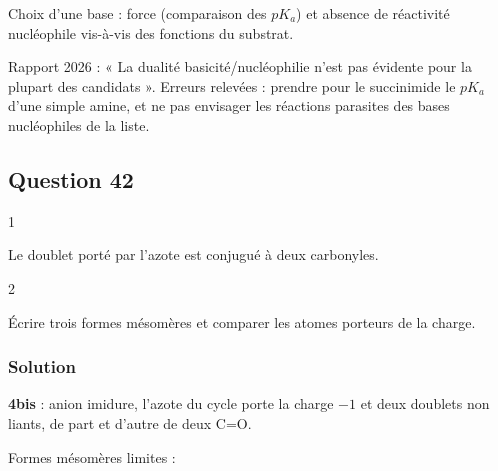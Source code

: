 \documentclass[11pt,a4paper]{article}
\newcommand{\equationajustee}[1]{%
  \sbox{\boiteequation}{$\displaystyle #1$}%
  \ifdim\wd\boiteequation>\linewidth
    \[\resizebox{\linewidth}{!}{\usebox{\boiteequation}}\]%
  \else
    \[#1\]%
  \fi}
\begin{document}
\equationajustee{\boxed{\mathbf{R1}=\mathrm{NaH}}}

\begin{methode}

Choix d'une base : force (comparaison des \(pK_a\)) et absence de réactivité nucléophile vis-à-vis des fonctions du substrat.

\end{methode}

\begin{piege}

Rapport 2026 : « La dualité basicité/nucléophilie n'est pas évidente pour la plupart des candidats ». Erreurs relevées : prendre pour le succinimide le \(pK_a\) d'une simple amine, et ne pas envisager les réactions parasites des bases nucléophiles de la liste.

\end{piege}

\hypertarget{question-42}{%
\subsection{Question 42}\label{question-42}}

\begin{indication}{1}

Le doublet porté par l'azote est conjugué à deux carbonyles.

\end{indication}

\begin{indication}{2}

Écrire trois formes mésomères et comparer les atomes porteurs de la charge.

\end{indication}

\hypertarget{solution-41}{%
\subsubsection{Solution}\label{solution-41}}

\textbf{4bis} : anion imidure, l'azote du cycle porte la charge \(-1\) et deux doublets non liants, de part et d'autre de deux C=O.

Formes mésomères limites :
\end{document}
